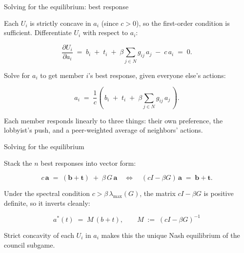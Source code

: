 \documentclass[aspectratio=169]{beamer}
\newcommand{\accentline}{\vspace{1pt}{\color{accent}\rule{0.3\textwidth}{1.5pt}}\vspace{4pt}}
\begin{document}
\begin{frame}{Solving for the equilibrium: best response}
\accentline
\vspace{8pt}

{\small Each $U_i$ is strictly concave in $a_i$ (since $c > 0$), so the first-order condition is sufficient. Differentiate $U_i$ with respect to $a_i$:}

\vspace{2pt}
\[
    \frac{\partial U_i}{\partial a_i} \;=\; b_i \;+\; t_i \;+\; \beta \sum_{j \in N} g_{ij}\, a_j \;-\; c\, a_i \;=\; 0.
\]

{\small Solve for $a_i$ to get member $i$'s best response, given everyone else's actions:}

\vspace{2pt}
\[
    a_i \;=\; \frac{1}{c}\!\left(\, b_i \;+\; t_i \;+\; \beta \sum_{j \in N} g_{ij}\, a_j \,\right).
\]

\vspace{6pt}

{\small\color{midgray} Each member responds linearly to three things: their own preference, the lobbyist's push, and a peer-weighted average of neighbors' actions.}
\end{frame}

\begin{frame}{Solving for the equilibrium}
\accentline
\vspace{8pt}

{\small Stack the $n$ best responses into vector form:}

\vspace{2pt}
\[
    c\,\mathbf{a} \;=\; (\mathbf{b} + \mathbf{t}) \;+\; \beta\, G\,\mathbf{a}
    \quad\Longleftrightarrow\quad
    (cI - \beta G)\,\mathbf{a} \;=\; \mathbf{b} + \mathbf{t}.
\]

{\small Under the spectral condition $c > \beta\,\lambda_{\max}(G)$, the matrix $cI - \beta G$ is positive definite, so it inverts cleanly:}

\vspace{2pt}
\[
    \boxed{\;a^*(t) \;=\; M\,(b + t), \qquad M \;:=\; (cI - \beta G)^{-1}\;}
\]

\vspace{6pt}

{\small\color{midgray} Strict concavity of each $U_i$ in $a_i$ makes this the unique Nash equilibrium of the council subgame.}
\end{frame}
\end{document}
